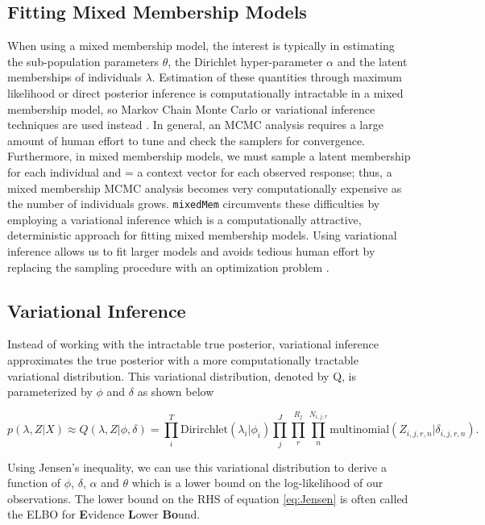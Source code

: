 \documentclass{article}\usepackage[]{graphicx}\usepackage[]{color}
\begin{document}
\subsection{Fitting Mixed Membership Models}
When using a mixed membership model, the interest is typically in estimating the sub-population parameters $\theta$, the Dirichlet hyper-parameter $\alpha$ and the latent memberships of individuals $\lambda$. Estimation of these quantities through maximum likelihood or direct posterior inference is computationally intractable in a mixed membership model, so Markov Chain Monte Carlo or variational inference techniques are used instead \citep{airoldi2009mixed}. In general, an MCMC analysis requires a large amount of human effort to tune and check the samplers for convergence. Furthermore, in mixed membership models, we must sample a latent membership for each individual and = a context vector for each observed response; thus, a mixed membership MCMC analysis becomes very computationally expensive as the number of individuals grows. \texttt{mixedMem} circumvents these difficulties by employing a variational inference which is a computationally attractive, deterministic approach for fitting mixed membership models. Using variational inference allows us to fit larger models and avoids tedious human effort by replacing the sampling procedure with an optimization problem \citep{beal2003variational}.  

\subsection{Variational Inference}\label{VI}
Instead of working with the intractable true posterior, variational inference approximates the true posterior with a more computationally tractable variational distribution. This variational distribution, denoted by Q, is parameterized by $\phi$ and $\delta$ as shown below 

\begin{equation} \label{eq:varDist}
p(\lambda, Z|X) \approx Q(\lambda,Z|\phi, \delta) = \prod_i^T \text{Dirirchlet}(\lambda_i|\phi_i)\prod_j^J \prod_r^{R_j} \prod_n^{N_{i,j,r}}\text{multinomial}(Z_{i,j,r,n}|\delta_{i,j,r,n}).
\end{equation}

Using Jensen's inequality, we can use this variational distribution to derive a function of $\phi$, $\delta$, $\alpha$ and $\theta$ which is a lower bound on the log-likelihood of our observations. The lower bound on the RHS of equation \ref{eq:Jensen} is often called the ELBO for \textbf{E}vidence \textbf{L}ower \textbf{Bo}und. 
\end{document}
